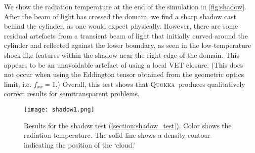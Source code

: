 \documentclass[fleqn,usenatbib]{mnras}
\newcommand{\quokka}{\textsc{Quokka}}
\begin{document}
We show the radiation temperature at the end of the simulation in \autoref{fig:shadow}. After the beam of light has crossed the domain, we find a sharp shadow cast behind the cylinder, as one would expect physically. However, there are some residual artefacts from a transient beam of light that initially curved around the cylinder and reflected against the lower boundary, as seen in the low-temperature shock-like features within the shadow near the right edge of the domain. This appears to be an unavoidable artefact of using a local VET closure. (This does not occur when using the Eddington tensor obtained from the geometric optics limit, i.e. $f_{xx} = 1$.) Overall, this test shows that \quokka~produces qualitatively correct results for semitransparent problems.
\begin{figure*}
    \texttt{[image: shadow1.png]}
    \caption{Results for the shadow test (\autoref{section:shadow_test}). Color shows the radiation temperature. The solid line shows a density contour indicating the position of the `cloud.'}
    \label{fig:shadow}
\end{figure*}
\end{document}
